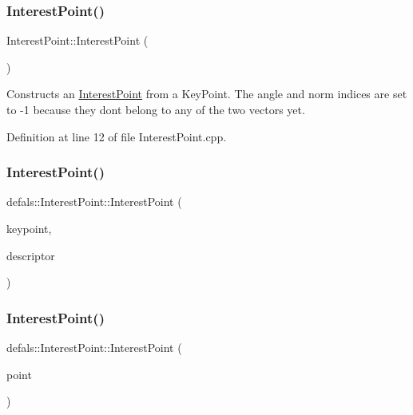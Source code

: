 \subsubsection{\texorpdfstring{Interest\+Point()}{InterestPoint()}\hspace{0.1cm}{\footnotesize\ttfamily [1/3]}}
{\footnotesize\ttfamily Interest\+Point\+::\+Interest\+Point (\begin{DoxyParamCaption}{ }\end{DoxyParamCaption})}

Constructs an \hyperlink{classdefals_1_1_interest_point}{Interest\+Point} from a Key\+Point. The angle and norm indices are set to -\/1 because they don\textquotesingle{}t belong to any of the two vectors yet. 

Definition at line 12 of file Interest\+Point.\+cpp.

\mbox{\label{classdefals_1_1_interest_point_a04ef8003424a0d0a122ba8ec1d1bd8b6}} 
\subsubsection{\texorpdfstring{Interest\+Point()}{InterestPoint()}\hspace{0.1cm}{\footnotesize\ttfamily [2/3]}}
{\footnotesize\ttfamily defals\+::\+Interest\+Point\+::\+Interest\+Point (\begin{DoxyParamCaption}\item[{const cv\+::\+Key\+Point \&}]{keypoint,  }\item[{const cv\+::\+Mat \&}]{descriptor }\end{DoxyParamCaption})}

\mbox{\label{classdefals_1_1_interest_point_a0c56edbec7b284702d2c8f9fc2aa55f4}} 
\subsubsection{\texorpdfstring{Interest\+Point()}{InterestPoint()}\hspace{0.1cm}{\footnotesize\ttfamily [3/3]}}
{\footnotesize\ttfamily defals\+::\+Interest\+Point\+::\+Interest\+Point (\begin{DoxyParamCaption}\item[{const cv\+::\+Point2f \&}]{point }\end{DoxyParamCaption})}



